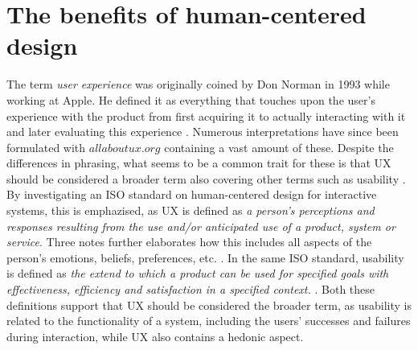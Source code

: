 \section{The benefits of human-centered design}
\label{UXbenefits}
The term \textit{user experience} was originally coined by Don Norman in 1993 while working at Apple. He defined it as everything that touches upon the user's experience with the product from first acquiring it to actually interacting with it and later evaluating this experience \parencite{WEB:DonNormanOnUX}. Numerous interpretations have since been formulated with $allaboutux.org$ containing a vast amount of these. Despite the differences in phrasing, what seems to be a common trait for these is that UX should be considered a broader term also covering other terms such as usability \parencite{WEB:UXDefinitions}. By investigating an ISO standard on human-centered design for interactive systems, this is emphazised, as UX is defined as \textit{a person's perceptions and responses resulting from the use and/or anticipated use of a product, system or service}. Three notes further elaborates how this includes all aspects of the person's emotions, beliefs, preferences, etc. \parencite[][3]{WEB:UXISO}. In the same ISO standard, usability is defined as \textit{the extend to which a product can be used for specified goals with effectiveness, efficiency and satisfaction in a specified context.} \parencite{WEB:UXISO}. Both these definitions support that UX should be considered the broader term, as usability is related to the functionality of a system, including the users' successes and failures during interaction, while UX also contains a hedonic aspect.\\

